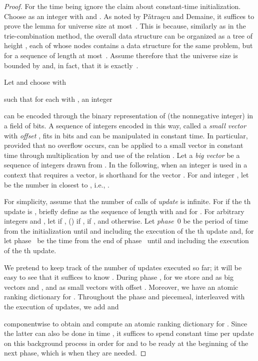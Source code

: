 \documentclass[envcountsame,envcountsect,undated,nolinenumbers]{lnthi}
\def\Tvn#1{\hbox{\textit{#1\/}}}
\begin{document}
\begin{proof}
For the time being ignore the claim about constant-time initialization.
Choose  as an integer with  and
.
As noted by P\v atra\c scu and Demaine,
it suffices to prove the lemma for
universe size at most~.
This is because,
similarly as in the trie-combination method,
the overall data structure can
be organized as a tree  of height
, each of whose
 nodes contains a data structure for the
same problem, but for a sequence of
length at most~.
Assume therefore that
the universe size is bounded by 
and, in fact, that it is exactly~.

Let 
and choose  with

such that for each  with , an integer

can be encoded through the binary
representation of (the nonnegative
integer)  in a field
of  bits.
A sequence of  integers encoded in this way,
called a \emph{small vector} with \emph{offset} , fits in
 bits and can be manipulated in constant time.
In particular, provided that no overflow occurs,
 can be applied to a small vector
in constant time
through multiplication by  and use of
the relation .
Let a \emph{big vector} be a sequence of 
integers drawn from .
In the following, when an integer  is used
in a context that requires a vector,
 is shorthand for the vector .
For  and
integer , let
 be the number in 
closest to , i.e., .

For simplicity, assume that the number of
calls of \Tvn{update} is infinite.
For  if the th update
is , briefly define 
as the sequence of length  with
 and  for
.
For arbitrary integers  and ,
let  if ,
 () if ,
 if
, and  otherwise.
Let \emph{phase}~0 be the period of time from the
initialization until and including the
execution of the th update and,
for  let phase~
be the time from the end of phase~
until and including the execution of
the th update.

We pretend to keep track of the number 
of updates executed so far;
it will be easy to see that it suffices
to know .
During phase , for 
we store  and 
as big vectors and
,
 and
 as small vectors with offset .
Moreover, we have an atomic ranking dictionary
 for .
Throughout the phase and piecemeal, interleaved with
the execution of updates, we add
 and

componentwise to obtain 
and compute an atomic ranking dictionary  for
.
Since the latter can also be done in 
time \cite[Corollary~8]{Hag98}, it suffices
to spend constant time per update on
this background process in order for
 and 
to be ready at the beginning of the next phase,
which is when they are needed.


\end{proof}
\end{document}
